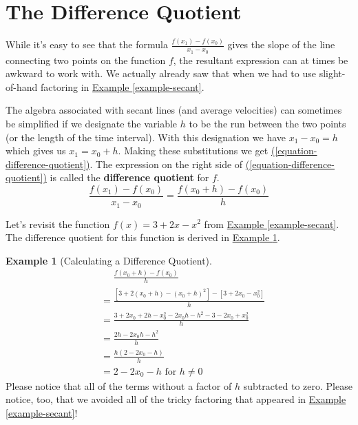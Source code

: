 \documentclass[10pt,oneside,]{book}
\newcommand{\terminology}[1]{\textbf{#1}}
\theoremstyle{plain}
\theoremstyle{definition}
\newtheorem{example}[theorem]{Example}
\numberwithin{equation}{section}
\newcommand{\fe}[2]{#1\mathopen{}\left(#2\right)\mathclose{}}
\begin{document}
\section[The Difference Quotient]{The Difference Quotient}\label{section-difference-quotient}
While it's easy to see that the formula \(\frac{\fe{f}{x_1}-\fe{f}{x_0}}{x_1-x_0}\) gives the slope of the line connecting two points on the function \(f\), the resultant expression can at times be awkward to work with. We actually already saw that when we had to use slight-of-hand factoring in \hyperref[example-secant]{Example \ref{example-secant}}.%
\par
The algebra associated with secant lines (and average velocities) can sometimes be simplified if we designate the variable \(h\) to be the run between the two points (or the length of the time interval). With this designation we have \(x_1-x_0=h\) which gives us \(x_1=x_0+h\). Making these substitutions we get \hyperref[equation-difference-quotient]{(\ref{equation-difference-quotient})}. The expression on the right side of \hyperref[equation-difference-quotient]{(\ref{equation-difference-quotient})} is called the \terminology{difference quotient} for \(f\).%
\begin{equation}\frac{\fe{f}{x_1}-\fe{f}{x_0}}{x_1-x_0}=\frac{\fe{f}{x_0+h}-\fe{f}{x_0}}{h}\label{equation-difference-quotient}\end{equation}\par
Let's revisit the function \(\fe{f}{x}=3+2x-x^2\) from \hyperref[example-secant]{Example \ref{example-secant}}. The difference quotient for this function is derived in \hyperref[example-difference-quotient]{Example \ref{example-difference-quotient}}.%
\begin{example}[Calculating a Difference Quotient]\label{example-difference-quotient}
\begin{align*}
&\phantom{{}={}}\frac{\fe{f}{x_0+h}-\fe{f}{x_0}}{h}\\
&=\frac{\left[3+2\left(x_0+h\right)-\left(x_0+h\right)^2\right]-\left[3+2x_0-x_0^2\right]}{h}\\
&=\frac{3+2x_0+2h-x_0^2-2x_0h-h^2-3-2x_0+x_0^2}{h}\\
&=\frac{2h-2x_0h-h^2}{h}\\
&=\frac{h\left(2-2x_0-h\right)}{h}\\
&=2-2x_0-h\text{ for }h\neq 0
\end{align*}Please notice that all of the terms without a factor of \(h\) subtracted to zero. Please notice, too, that we avoided all of the tricky factoring that appeared in \hyperref[example-secant]{Example \ref{example-secant}}!%
\end{example}
\end{document}
